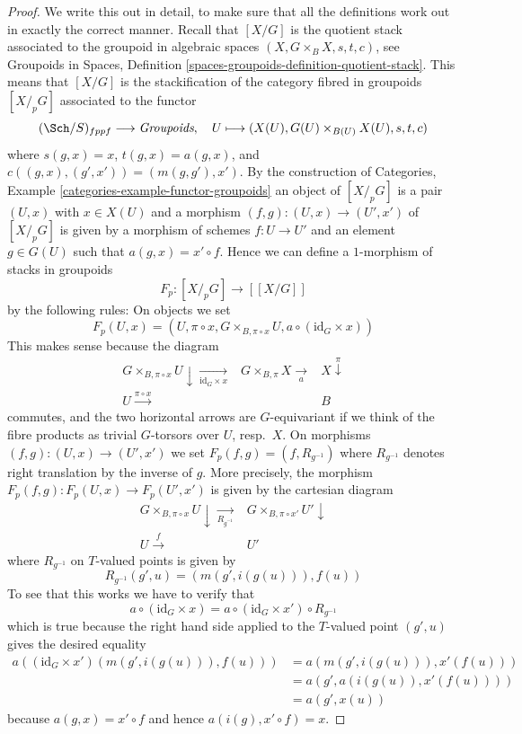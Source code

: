 \begin{proof}
We write this out in detail, to make sure that all the definitions
work out in exactly the correct manner.
Recall that $[X/G]$ is the quotient stack
associated to the groupoid in algebraic spaces
$(X, G \times_B X, s, t, c)$, see
Groupoids in Spaces,
Definition \ref{spaces-groupoids-definition-quotient-stack}.
This means that $[X/G]$ is the stackification of the
category fibred in groupoids $[X/_{\!p}G]$ associated to the functor
$$
(\Sch/S)_{fppf} \longrightarrow \textit{Groupoids},
\quad
U \longmapsto (X(U), G(U) \times_{B(U)} X(U), s, t, c)
$$
where $s(g, x) = x$, $t(g, x) = a(g, x)$, and
$c((g, x), (g', x')) = (m(g, g'), x')$. By the construction of
Categories, Example \ref{categories-example-functor-groupoids}
an object of $[X/_{\!p}G]$ is a pair $(U, x)$ with $x \in X(U)$
and a morphism $(f, g) : (U, x) \to (U', x')$ of $[X/_{\!p}G]$
is given by a morphism of schemes $f : U \to U'$ and an element
$g \in G(U)$ such that $a(g, x) = x' \circ f$.
Hence we can define a $1$-morphism of stacks in groupoids
$$
F_p : [X/_{\!p}G] \longrightarrow [[X/G]]
$$
by the following rules: On objects we set
$$
F_p(U, x) =
(U, \pi \circ x, G \times_{B, \pi \circ x} U, a \circ (\text{id}_G \times x))
$$
This makes sense because the diagram
$$
\begin{array}{ccc}G \times_{B, \pi \circ x} U \downarrow\underset{\text{id}_G \times x}{\longrightarrow} & G \times_{B, \pi} X \underset{a}{\longrightarrow} & X \overset{\pi}{\downarrow} \\ U \overset{\pi \circ x}{\longrightarrow} &  & B\end{array}
$$
commutes, and the two horizontal arrows are $G$-equivariant if we think
of the fibre products as trivial $G$-torsors over $U$, resp.\ $X$.
On morphisms $(f, g) : (U, x) \to (U', x')$ we set
$F_p(f, g) = (f, R_{g^{-1}})$ where $R_{g^{-1}}$ denotes right translation
by the inverse of $g$. More precisely, the morphism
$F_p(f, g) : F_p(U, x) \to F_p(U', x')$ is given by the cartesian diagram
$$
\begin{array}{cc}G \times_{B, \pi \circ x} U \downarrow\underset{R_{g^{-1}}}{\longrightarrow} & G \times_{B, \pi \circ x'} U' \downarrow \\ U \overset{f}{\longrightarrow} & U'\end{array}
$$
where $R_{g^{-1}}$ on $T$-valued points is given by
$$
R_{g^{-1}}(g', u) = (m(g', i(g(u))), f(u))
$$
To see that this works we have to verify that
$$
a \circ (\text{id}_G \times x)
=
a \circ (\text{id}_G \times x') \circ R_{g^{-1}}
$$
which is true because the right hand side applied to the $T$-valued point
$(g', u)$ gives the desired equality
\begin{align*}
a((\text{id}_G \times x')(m(g', i(g(u))), f(u)))
& =
a(m(g', i(g(u))), x'(f(u))) \\
& =
a(g', a(i(g(u)), x'(f(u)))) \\
& =
a(g', x(u))
\end{align*}
because $a(g, x) = x' \circ f$ and hence $a(i(g), x' \circ f) = x$.


\end{proof}
